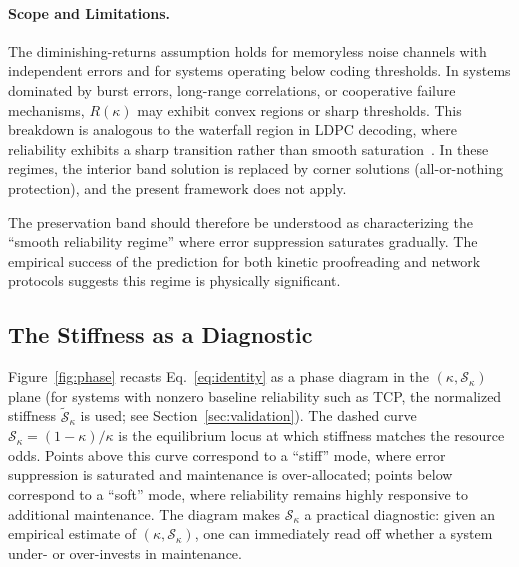 \documentclass[11pt,twocolumn]{article}
\begin{document}
\paragraph{Scope and Limitations.} The diminishing-returns assumption holds for memoryless noise channels with independent errors and for systems operating below coding thresholds. In systems dominated by burst errors, long-range correlations, or cooperative failure mechanisms, $R(\kappa)$ may exhibit convex regions or sharp thresholds. This breakdown is analogous to the waterfall region in LDPC decoding, where reliability exhibits a sharp transition rather than smooth saturation~\cite{Richardson2001}. In these regimes, the interior band solution is replaced by corner solutions (all-or-nothing protection), and the present framework does not apply.

The preservation band should therefore be understood as characterizing the ``smooth reliability regime'' where error suppression saturates gradually. The empirical success of the prediction for both kinetic proofreading and network protocols suggests this regime is physically significant.

\subsection{The Stiffness as a Diagnostic}
\label{sec:diagnostic}

Figure~\ref{fig:phase} recasts Eq.~\eqref{eq:identity} as a phase diagram in the $(\kappa, \mathcal{S}_\kappa)$ plane (for systems with nonzero baseline reliability such as TCP, the normalized stiffness $\tilde{\mathcal{S}}_\kappa$ is used; see Section~\ref{sec:validation}). The dashed curve $\mathcal{S}_\kappa = (1-\kappa)/\kappa$ is the equilibrium locus at which stiffness matches the resource odds. Points above this curve correspond to a ``stiff'' mode, where error suppression is saturated and maintenance is over-allocated; points below correspond to a ``soft'' mode, where reliability remains highly responsive to additional maintenance. The diagram makes $\mathcal{S}_\kappa$ a practical diagnostic: given an empirical estimate of $(\kappa, \mathcal{S}_\kappa)$, one can immediately read off whether a system under- or over-invests in maintenance.
\end{document}
